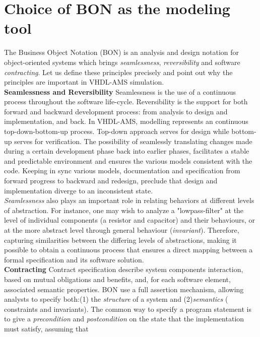 \documentclass{article}
\newcommand{\inv}{\emph{invariant}\xspace}
\begin{document}
\section{Choice of BON as the modeling tool}
\label{sec:choiceobon}
The Business Object Notation (BON) is an analysis and design notation
for object-oriented systems  which brings \emph{seamlessness},\xspace
\emph{reversibility} and software \emph{contracting}.
Let us define these principles precisely and point out why the principles
are important in VHDL-AMS simulation.\\
\textbf{Seamlessness and  Reversibility} \xspace \xspace
Seamlessness is the use of a continuous process
throughout the software life-cycle. Reversibility is the support for
both forward and backward development process: from analysis to design
and implementation, and back.
In VHDL-AMS, modelling represents an continuous top-down-bottom-up
process. Top-down approach serves for design while bottom-up
serves for verification. The possibility of seamlessly translating
changes made during a certain development phase back into earlier phases,
facilitates a stable and predictable environment and ensures the various
models consistent with the code. Keeping in sync various models, documentation
and specification from forward progress to backward and redesign, preclude
that design and implementation diverge to an inconsistent state.\\
\emph{Seamlessness} also plays an important role in relating behaviors at
different levels of abstraction. For instance, one may wish to analyze
a "lowpass-filter" at the level of individual components (a resistor and 
capacitor) and their behaviours, or at the more abstract level through
general behaviour (\inv).
 Therefore, capturing similarities between the differing levels of abstractions,
making it possible to obtain a continuous process that ensures a direct mapping
between a formal specification and its software solution.\\
\textbf{Contracting} \xspace \xspace Contract specification describe 
system components interaction, based on mutual obligations and benefits, 
and, for each software element, associated semantic properties. BON use a full
assertion mechanism, allowing analysts to specify both:\xspace (1) the \emph{structure} of
a system and (2)\xspace \emph{semantics} ( constraints and invariants).
The common way to specify a program statement is to give a \emph{precondition} and
\emph{postcondition} on the state that the implementation must satisfy, assuming that
\end{document}

